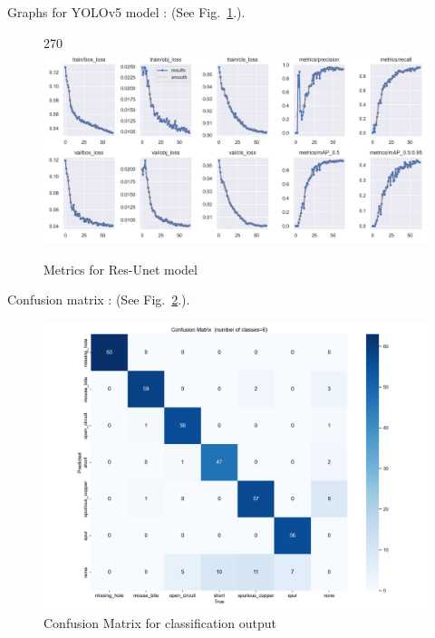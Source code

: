 \documentclass[12pt]{article}
\begin{document}
Graphs for YOLOv5 model : (See Fig.~\ref{fig:graphs_yolo}.).
\begin{figure}[p]
    \centering
    \begin{turn}{270}
    \includegraphics[width=1\paperwidth,height=1\paperheight,keepaspectratio]{./graphics/graphs_yolo.png}
    \end{turn}
    \caption{Metrics for Res-Unet model}
    \label{fig:graphs_yolo}
\end{figure}
\restoregeometry

\clearpage
\newpage

Confusion matrix : (See Fig.~\ref{fig:confusion_yolo}.).
\begin{figure}[H]
    \centering\includegraphics[width=0.7\paperwidth,height=0.7\paperheight,keepaspectratio]{./graphics/confusion_matrix_yolo.png}
    \caption{Confusion Matrix for classification output}
    \label{fig:confusion_yolo}
\end{figure}
\end{document}
